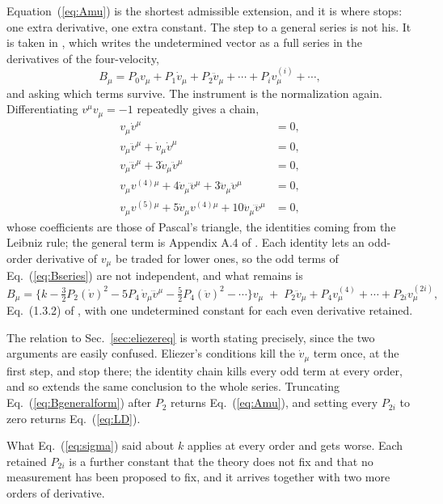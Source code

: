 \documentclass[preprint]{aastex701}
\begin{document}
Equation~(\ref{eq:Amu}) is the shortest admissible extension, and it is where
\citet{eliezer1947} stops: one extra derivative, one extra constant. The step
to a general series is not his. It is taken in \citet{zhang2006}, which writes
the undetermined vector as a full series in the derivatives of the
four-velocity,
\begin{equation}
B_\mu = P_0 v_\mu + P_1\dot v_\mu + P_2\ddot v_\mu + \cdots
      + P_i v^{(i)}_\mu + \cdots ,
\label{eq:Bseries}
\end{equation}
and asking which terms survive. The instrument is the normalization again.
Differentiating $v^\mu v_\mu=-1$ repeatedly gives a chain,
\begin{align}
v_\mu \dot v^\mu &= 0, \nonumber\\
v_\mu \ddot v^\mu + \dot v_\mu \dot v^\mu &= 0, \nonumber\\
v_\mu \dddot v^\mu + 3\dot v_\mu \ddot v^\mu &= 0, \nonumber\\
v_\mu v^{(4)\mu} + 4\dot v_\mu \dddot v^\mu + 3\ddot v_\mu \ddot v^\mu &= 0,
\nonumber\\
v_\mu v^{(5)\mu} + 5\dot v_\mu v^{(4)\mu} + 10\ddot v_\mu \dddot v^\mu &= 0,
\label{eq:vchain}
\end{align}
whose coefficients are those of Pascal's triangle, the identities coming from
the Leibniz rule; the general term is Appendix A.4 of \citet{zhang2006}. Each
identity lets an odd-order derivative of $v_\mu$ be traded for lower ones, so
the odd terms of Eq.~(\ref{eq:Bseries}) are not independent, and what remains is
\begin{equation}
B_\mu = \Big\{k - \tfrac32 P_2(\dot v)^2
  - 5P_4\,\dot v_\mu \dddot v^\mu - \tfrac52 P_4(\ddot v)^2 - \cdots\Big\}v_\mu
  \;+\; P_2\ddot v_\mu + P_4 v^{(4)}_\mu + \cdots + P_{2i}v^{(2i)}_\mu ,
\label{eq:Bgeneralform}
\end{equation}
Eq.~(1.3.2) of \citet{zhang2006}, with one undetermined constant for each even
derivative retained.

The relation to Sec.~\ref{sec:eliezereq} is worth stating precisely, since the
two arguments are easily confused. Eliezer's conditions kill the $\dot v_\mu$
term once, at the first step, and stop there; the identity chain kills every odd
term at every order, and so extends the same conclusion to the whole series.
Truncating Eq.~(\ref{eq:Bgeneralform}) after $P_2$ returns
Eq.~(\ref{eq:Amu}), and setting every $P_{2i}$ to zero returns
Eq.~(\ref{eq:LD}).

What Eq.~(\ref{eq:sigma}) said about $k$ applies at every order and gets worse.
Each retained $P_{2i}$ is a further constant that the theory does not fix and
that no measurement has been proposed to fix, and it arrives together with two
more orders of derivative.
\end{document}
